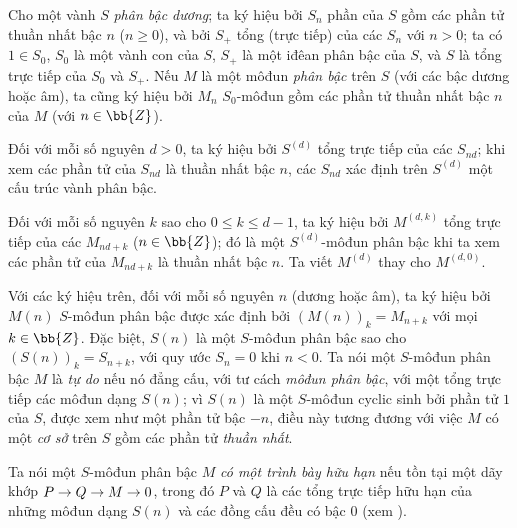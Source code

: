 \documentclass[oneside,10pt]{amsart}
\makeatletter
\renewcommand{\leq}{\leqslant}
\renewcommand{\geq}{\geqslant}
\newcommand{\ega@arrow}[2]{\mathchoice{#1}{#2}{#2}{#2}}
\renewcommand{\to}{\ega@arrow{\longrightarrow}{\rightarrow}}
\newcommand{\oldpage}[2][]{\marginnote{\normalfont\footnotesize\textbf{#1}~|~#2}\ignorespaces}
\let\EGAOriginalLabel\label
\renewcommand{\label}[1]{\phantomsection\EGAOriginalLabel{#1}}
\makeatother
\begin{document}
\begin{notation}[2.1.1]
\label{II.2.1.1}
Cho một vành $S$ \emph{phân bậc dương}; ta ký hiệu bởi $S_n$ phần của $S$ gồm các phần tử thuần nhất bậc $n$ ($n\geq0$), và bởi $S_+$ tổng (trực tiếp) của các $S_n$ với $n>0$; ta có $1\in S_0$, $S_0$ là một vành con của $S$, $S_+$ là một iđêan phân bậc của $S$, và $S$ là tổng trực tiếp của $S_0$ và $S_+$.
Nếu $M$ là một môđun \emph{phân bậc} trên $S$ (với các bậc dương hoặc âm), ta cũng ký hiệu bởi $M_n$ $S_0$-môđun gồm các phần tử thuần nhất bậc $n$ của $M$ (với $n\in\bb{Z}$).

Đối với mỗi số nguyên $d>0$, ta ký hiệu bởi $S^{(d)}$ tổng trực tiếp của các $S_{nd}$; khi xem các phần tử của $S_{nd}$ là thuần nhất bậc $n$, các $S_{nd}$ xác định trên $S^{(d)}$ một cấu trúc vành phân bậc.

Đối với mỗi số nguyên $k$ sao cho $0\leq k\leq d-1$, ta ký hiệu bởi $M^{(d,k)}$ tổng trực tiếp
\oldpage[II]{20}
của các $M_{nd+k}$ ($n\in\bb{Z}$); đó là một $S^{(d)}$-môđun phân bậc khi ta xem các phần tử của $M_{nd+k}$ là thuần nhất bậc $n$.
Ta viết $M^{(d)}$ thay cho $M^{(d,0)}$.

Với các ký hiệu trên, đối với mỗi số nguyên $n$ (dương hoặc âm), ta ký hiệu bởi $M(n)$ $S$-môđun phân bậc được xác định bởi $(M(n))_k=M_{n+k}$ với mọi $k\in\bb{Z}$.
Đặc biệt, $S(n)$ là một $S$-môđun phân bậc sao cho $(S(n))_k=S_{n+k}$, với quy ước $S_n=0$ khi $n<0$.
Ta nói một $S$-môđun phân bậc $M$ là \emph{tự do} nếu nó đẳng cấu, với tư cách \emph{môđun phân bậc}, với một tổng trực tiếp các môđun dạng $S(n)$; vì $S(n)$ là một $S$-môđun cyclic sinh bởi phần tử $1$ của $S$, được xem như một phần tử bậc $-n$, điều này tương đương với việc $M$ có một \emph{cơ sở} trên $S$ gồm các phần tử \emph{thuần nhất}.

Ta nói một $S$-môđun phân bậc $M$ \emph{có một trình bày hữu hạn} nếu tồn tại một dãy khớp $P\to Q\to M\to0$, trong đó $P$ và $Q$ là các tổng trực tiếp hữu hạn của những môđun dạng $S(n)$ và các đồng cấu đều có bậc $0$ (xem ).
\end{notation}
\end{document}
